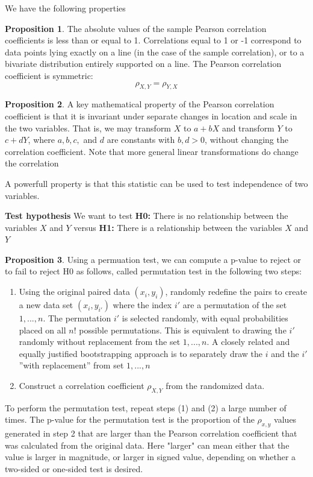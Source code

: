 \documentclass[a4paper]{article}
\theoremstyle{definition}
\theoremstyle{proposition}
\newtheorem{proposition}{Proposition}[section]
\begin{document}
We have the following properties
\begin{proposition}
The absolute values of the sample Pearson correlation coefficients is less than or equal to 1. Correlations equal to 1 or -1 correspond to data points lying exactly on a line (in the case of the sample correlation), or to a bivariate distribution entirely supported on a line. The Pearson correlation coefficient is symmetric: 
\[ 
\rho_{X,Y}= \rho_{Y,X}
\]
\end{proposition}

\begin{proposition}
A key mathematical property of the Pearson correlation coefficient is that it is invariant under separate changes in location and scale in the two variables. That is, we may transform $X$ to $ a + bX$ and transform $Y$ to $c + dY$, where $a, b, c,$ and $d$ are constants with $b, d > 0$, without changing the correlation coefficient. Note that more general linear transformations do change the correlation
\end{proposition}

A powerfull property is that this statistic can be used to test independence of two variables.\newline


\textbf{Test hypothesis} \newline
We want to test \textbf{H0:} There is no relationship between the variables $X$ and $Y$ versus \textbf{H1:} There is a relationship between the variables $X$ and $Y$



\begin{proposition}
Using a permuation test, we can compute a p-value to reject or to fail to reject H0 as follows, called permutation test in the following two steps: 

\begin{enumerate}
\item  Using the original paired data $(x_i,y_i)$, randomly redefine the pairs to create a new data set $(x_i,y_{i'})$ where the index $i'$ are a permutation of the set ${1,...,n}$.  
The permutation $i'$  is selected randomly, with equal probabilities placed on all $n!$ possible permutations.  
This is equivalent to drawing the $i'$ randomly without replacement from the set ${1, ..., n}$.  
A closely related and equally justified bootstrapping approach is to separately draw the $i$ and the $i'$  ''with replacement'' from  set ${1, ..., n}$
\item Construct a correlation coefficient $\rho_{X,Y}$ from the randomized data.
\end{enumerate}

To perform the permutation test, repeat steps (1) and (2) a large number of times.  The p-value for the permutation test is the proportion of the $\rho_{x,y}$ values generated in step 2 that are larger than the Pearson correlation coefficient that was calculated from the original data.  Here "larger" can mean either that the value is larger in magnitude, or larger in signed value, depending on whether a two-sided or one-sided test is desired.
\end{proposition}
\end{document}
